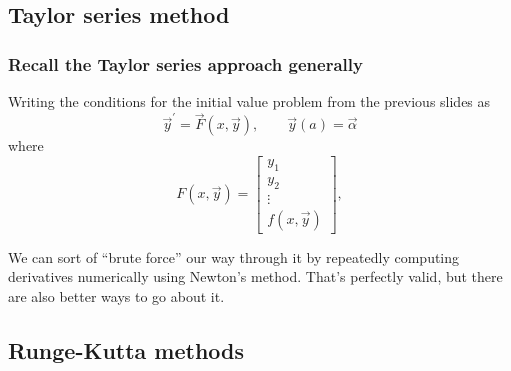 \documentclass[hyperref={colorlinks=true}]{beamer}
\begin{document}
\subsection[Taylor series method]{Taylor series method}

\begin{frame}%
  \frametitle{Recall the Taylor series approach generally}

  Writing the conditions for the initial value problem from the previous slides as
  \begin{equation}
    \vec{y}^{\prime} = \vec{F}(x, \vec{y}), \qquad \vec{y}(a) = \vec{\alpha}
  \end{equation}
  where 
  \begin{equation}
           F(x,\vec{y}) = \left[\begin{array}{c}
                             y_1 \\
                             y_2 \\
                             \vdots \\
                             f(x,\vec{y})
                           \end{array}\right],                      
  \end{equation}

  
  We can sort of ``brute force'' our way through it by repeatedly computing derivatives numerically using Newton's method. That's perfectly valid, but there are also better ways to go about it.

\end{frame}

\subsection[Runge-Kutta methods]{Runge-Kutta methods}
\end{document}

